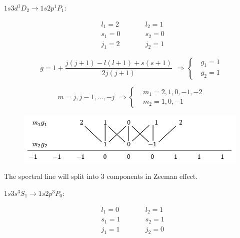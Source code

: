 \documentclass{article}
\begin{document}
$1s3d^1D_2 \rightarrow 1s2p^1P_1$:

\begin{equation*}
  \begin{aligned}
    & l_1 = 2 \\
    & s_1 = 0 \\
    & j_1 = 2
  \end{aligned}
  \quad\quad 
  \begin{aligned}
    & l_2 = 1 \\
    & s_2 = 0 \\
    & j_2 = 1
  \end{aligned}
\end{equation*}

\begin{equation*}
  \begin{aligned}
    g = 1 + \dfrac{j \left( j + 1 \right) - l \left( l + 1 \right) + s \left( s + 1 \right)}{2 j \left( j + 1 \right)} 
  \end{aligned}
  \Rightarrow
  \left\{
  \begin{aligned}
    & g_1 = 1 \\
    & g_2 = 1
  \end{aligned}
  \right.
\end{equation*}

\begin{equation*}
  \begin{aligned}
    m = j, j - 1, \dots, -j   
  \end{aligned}
  \Rightarrow
  \left\{
  \begin{aligned}
    & m_1 = 2,1,0,-1,-2 \\
    & m_2 = 1,0,-1
  \end{aligned}
  \right.
\end{equation*}

\begin{figure}[H]
  \centering
  \includegraphics[width=0.6\linewidth]{figures/Problem51}
  \label{fig:}
\end{figure}

The spectral line will split into $3$ components in Zeeman effect.

$1s3s^3S_1 \rightarrow 1s2p^3P_0$:

\begin{equation*}
  \begin{aligned}
    & l_1 = 0 \\
    & s_1 = 1 \\
    & j_1 = 1
  \end{aligned}
  \quad\quad 
  \begin{aligned}
    & l_2 = 1 \\
    & s_2 = 1 \\
    & j_2 = 0
  \end{aligned}
\end{equation*}
\end{document}
